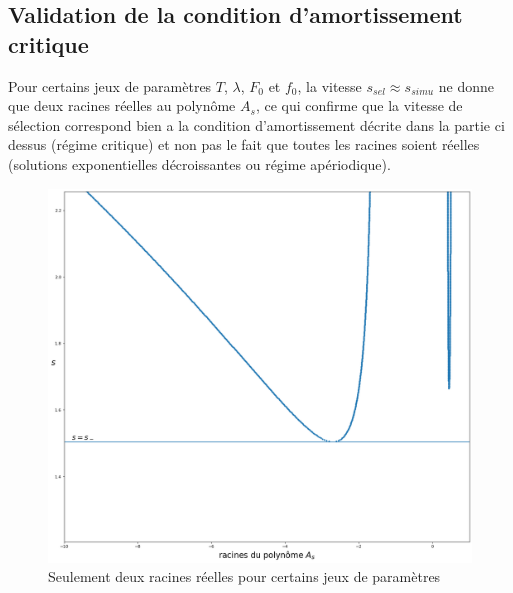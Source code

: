 \documentclass[11pt]{article}
\begin{document}
\subsection{Validation de la condition d'amortissement critique}
Pour certains jeux de paramètres $T$, $\lambda$, $F_0$ et $f_0$, la vitesse $s_{sel} \approx s_{simu}$ ne donne que deux racines réelles au polynôme $A_s$, ce qui confirme que la vitesse de sélection correspond bien a la condition d'amortissement décrite dans la partie ci dessus (régime critique) et non pas le fait que toutes les racines soient réelles (solutions exponentielles décroissantes ou régime apériodique).
\begin{figure}[h!]
\centering
\includegraphics[width=.9\textwidth]{Images/2racines.png}
\caption{Seulement deux racines réelles pour certains jeux de paramètres}
\end{figure}
\ifdefined\COMPLETE
\else
\end{document}
